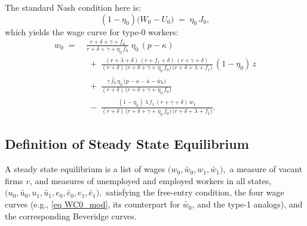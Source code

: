 \documentclass[12pt]{article} %
\theoremstyle{definition}
\begin{document}
\noindent The standard Nash condition here is:
\[
(1-\eta_0)\bigl(W_0 - U_0\bigr) \;=\; \eta_0\,J_0,
\]
which yields the wage curve for type-0 workers:
\begin{equation}\label{eq WC0_mod}
\begin{split}
w_0 \;=\;& \frac{r+\delta+\gamma+f_0}{r+\delta+\gamma+\eta_0\,f_0}\;\eta_0\,(p-\kappa) \\
&\;+\;\frac{(r+\lambda+\delta)\,(r+f_1+\delta)\,(r+\gamma+\delta)}{(r+\delta)\,\bigl(r+\delta+\gamma+\eta_0\,f_0\bigr)\,\bigl(r+\delta+\lambda+f_1\bigr)}\,(1-\eta_0)\,z \\  
&\;+\;\frac{\gamma\,\tilde{f_0}\,\eta_0\,\bigl(p-\kappa-\tilde{\kappa}-\tilde{w_0}\bigr)}{(r+\delta)\,\bigl(r+\delta+\gamma+\eta_0\,f_0\bigr)} \\
&\;-\;\frac{(1-\eta_0)\,\lambda\,f_1\,(r+\gamma+\delta)\,w_1}{(r+\delta)\,\bigl(r+\delta+\gamma+\eta_0\,f_0\bigr)\,\bigl(r+\delta+\lambda+f_1\bigr)}.
\end{split}
\end{equation}

\subsection{Definition of Steady State Equilibrium}

\noindent A steady state equilibrium is a list of wages 
$
\bigl(w_0, \tilde{w_0}, w_1, \tilde{w_1}\bigr),
$
a measure of vacant firms \(v\), and measures of unemployed and employed workers in all states,
$
\bigl(u_0, \tilde{u_0}, u_1, \tilde{u_1}, e_0, \tilde{e_0}, e_1, \tilde{e_1}\bigr),
$
satisfying the free-entry condition, the four wage curves (e.g., \eqref{eq WC0_mod}, its counterpart for \(\tilde{w_0}\), and the type-1 analogs), and the corresponding Beveridge curves.
\end{document}
